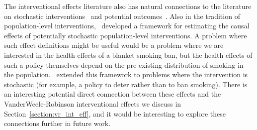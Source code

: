 The interventional effects literature also has natural connections to the literature on stochastic
interventions~\citep{vanderweelerobins2012} and potential 
outcomes~\citep{gelmanmikhaeil2025}. Also in the tradition of population-level 
interventions,~\cite{hubbardvanderlaan2008} developed a framework for estimating the causal 
effects of potentially stochastic population-level interventions. A problem where such 
effect definitions might be useful would be a problem where we are interested in the health effects 
of a blanket smoking ban, but the health effects of such a policy themselves depend on the 
pre-existing distribution of smoking in the population.~\cite{diazvanderlaan2012} extended this 
framework to problems where the intervention is stochastic (for example, a policy to deter rather 
than to ban smoking). There is an interesting potential direct connection between these effects
and the VanderWeele-Robinson interventional effects we discuss in Section~\ref{section:vr_int_eff}, 
and it would be interesting to explore these connections further in future work. 


